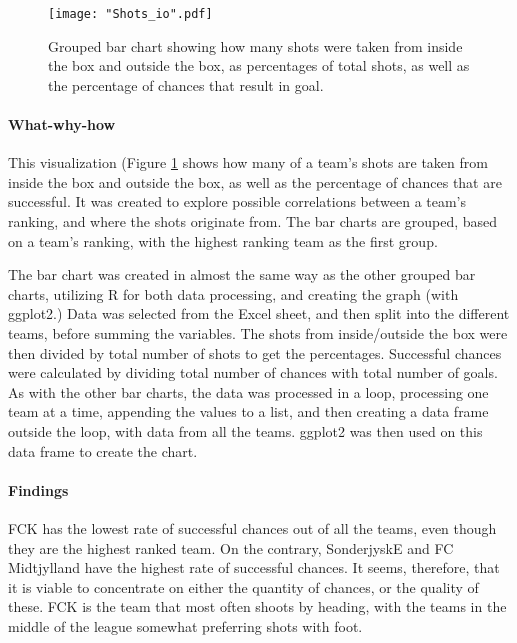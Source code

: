 \documentclass[Report.tex]{subfiles}
\begin{document}
\begin{figure}
\center
\texttt{[image: "Shots\_io".pdf]}
\caption{Grouped bar chart showing how many shots were taken from inside the
box and outside the box, as percentages of total shots, as well as the
percentage of chances that result in goal.}
\label{Fig:Shots_IO} 
\end{figure}

\paragraph{What-why-how\\}
This visualization (Figure \ref{Fig:Shots_IO} shows how many of a team's shots are taken from inside the
box and outside the box, as well as the percentage of chances that are successful.
It was created to explore possible correlations between a team's ranking, and
where the shots originate from. 
The bar charts are grouped, based on a team's ranking, with the highest ranking
team as the first group. 

The bar chart was created in almost the same way as the other grouped bar
charts, utilizing R for both data processing, and creating the graph (with
ggplot2.)
Data was selected from the Excel sheet, and then split into the different teams,
before summing the variables. The shots from inside/outside the box were then
divided by total number of shots to get the percentages. Successful chances were
calculated by dividing total number of chances with total number of goals.
As with the other bar charts, the data was processed in a loop, processing one
team at a time, appending the values to a list, and then creating a data frame
outside the loop, with data from all the teams. ggplot2 was then used on this
data frame to create the chart.

\paragraph{Findings\\}
FCK has the lowest rate of successful chances out of all the teams, even though they are 
the highest ranked team. On the contrary, SonderjyskE and FC Midtjylland have the highest rate of successful chances. It seems, therefore, that it is viable to concentrate on either the quantity of chances, or the quality of these. 
FCK is the team that most often shoots by heading, with the teams in the middle of the league
somewhat preferring shots with foot. 
\end{document}
